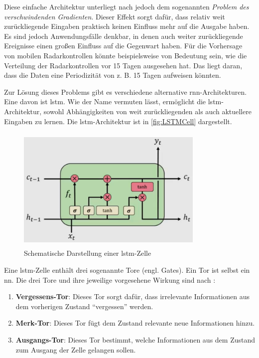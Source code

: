 Diese einfache Architektur unterliegt nach \cite[S. 260]{DeepLearningPythonKeras} jedoch dem sogenannten \emph{Problem des verschwindenden Gradienten}.
Dieser Effekt sorgt dafür, dass relativ weit zurückliegende Eingaben praktisch keinen Einfluss mehr auf die Ausgabe haben.
Es sind jedoch Anwendungsfälle denkbar, in denen auch weiter zurückliegende Ereignisse einen großen Einfluss auf die Gegenwart haben.
Für die Vorhersage von mobilen Radarkontrollen könnte beispielsweise von Bedeutung sein, wie die Verteilung der Radarkontrollen vor 15 Tagen ausgesehen hat.
Das liegt daran, dass die Daten eine Periodizität von z. B. 15 Tagen aufweisen könnten.

Zur Lösung dieses Problems gibt es verschiedene alternative \acrshort{rnn}-Architekturen.
Eine davon ist \acrfull{lstm}.
Wie der Name vermuten lässt, ermöglicht die \acrshort{lstm}-Architektur, sowohl Abhängigkeiten von weit zurückliegenden als auch aktuellere Eingaben zu lernen.
Die \acrshort{lstm}-Architektur ist in \autoref{fig:LSTMCell} dargestellt.

\begin{figure}[h]
    \centering
    \includegraphics[width=0.8\textwidth,height=6cm,keepaspectratio=true]{content/images/LSTMCell.png}
    \caption{Schematische Darstellung einer \acrshort{lstm}-Zelle \cite{6S191RNN}}
    \label{fig:LSTMCell}
\end{figure}

Eine \acrshort{lstm}-Zelle enthält drei sogenannte Tore (engl. Gates).
Ein Tor ist selbst ein \acrshort{nn}.
Die drei Tore und ihre jeweilige vorgesehene Wirkung sind nach \cite{6S191RNN}:

\begin{enumerate}
    \setlength\itemsep{0.2em}
    \item \textbf{Vergessens-Tor}: Dieses Tor sorgt dafür, dass irrelevante Informationen aus dem vorherigen Zustand "`vergessen"' werden.
    \item \textbf{Merk-Tor}: Dieses Tor fügt dem Zustand relevante neue Informationen hinzu.
    \item \textbf{Ausgangs-Tor}: Dieses Tor bestimmt, welche Informationen aus dem Zustand zum Ausgang der Zelle gelangen sollen.
\end{enumerate}

